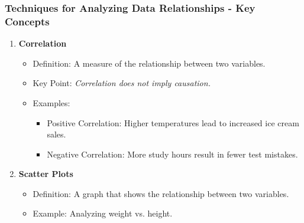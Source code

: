 \documentclass[aspectratio=169]{beamer}
\begin{document}
\begin{frame}[fragile]
    \frametitle{Techniques for Analyzing Data Relationships - Key Concepts}
    \begin{enumerate}
        \item \textbf{Correlation}
            \begin{itemize}
                \item Definition: A measure of the relationship between two variables.
                \item Key Point: \textit{Correlation does not imply causation.}
                \item Examples:
                    \begin{itemize}
                        \item Positive Correlation: Higher temperatures lead to increased ice cream sales.
                        \item Negative Correlation: More study hours result in fewer test mistakes.
                    \end{itemize}
            \end{itemize}
            
        \item \textbf{Scatter Plots}
            \begin{itemize}
                \item Definition: A graph that shows the relationship between two variables.
                \item Example: Analyzing weight vs. height.
            \end{itemize}
    \end{enumerate}
\end{frame}
\end{document}
